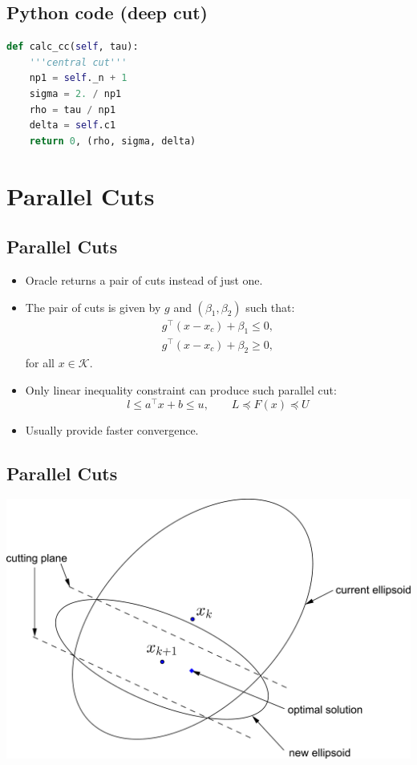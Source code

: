 \documentclass[]{article}
\begin{document}
\hypertarget{python-code-deep-cut-1}{%
\subsection{Python code (deep cut)}\label{python-code-deep-cut-1}}

\begin{lstlisting}[language=Python]
def calc_cc(self, tau):
    '''central cut'''
    np1 = self._n + 1
    sigma = 2. / np1
    rho = tau / np1
    delta = self.c1
    return 0, (rho, sigma, delta)
\end{lstlisting}

\hypertarget{parallel-cuts}{%
\section{Parallel Cuts}\label{parallel-cuts}}

\hypertarget{parallel-cuts-1}{%
\subsection{Parallel Cuts}\label{parallel-cuts-1}}

\begin{itemize}
\item
  Oracle returns a pair of cuts instead of just one.
\item
  The pair of cuts is given by \(g\) and \((\beta_1, \beta_2)\) such
  that: \[\begin{array}{l}
  g^\top (x - x_c) + \beta_1 \leq 0,  \\
  g^\top (x - x_c) + \beta_2 \geq 0,
  \end{array}\] for all \(x \in \mathcal{K}\).
\item
  Only linear inequality constraint can produce such parallel cut:
  \[ l \leq a^\top x + b \leq u, \qquad L \preceq F(x) \preceq U \]
\item
  Usually provide faster convergence.
\end{itemize}

\hypertarget{parallel-cuts-2}{%
\subsection{Parallel Cuts}\label{parallel-cuts-2}}

\includegraphics{ellipsoid.files/parallel_cut.pdf}
\end{document}
